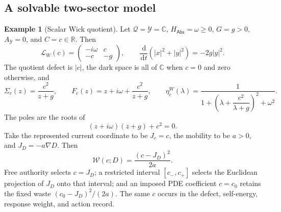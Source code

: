 \documentclass[11pt]{article}
\numberwithin{section}{part}
\theoremstyle{plain}
\theoremstyle{definition}
\newtheorem{example}[example]{Example}
\theoremstyle{remark}
\newcommand{\dd}{\,\mathrm d}
\newcommand{\Abs}{\mathsf{Abs}}
\begin{document}
\subsection{A solvable two-sector model}
\label{subsec:wick-solvable-model}

\begin{example}[Scalar Wick quotient]
\label{ex:scalar-wick-quotient}
Let \(\mathcal Q=\mathcal Y=\mathbb C\),
\(H_{\Abs}=\omega\ge0\), \(G=g>0\),
\(A_{\mathcal Y}=0\), and \(C=c\in\mathbb R\).  Then
\begin{equation}
 \label{eq:scalar-wick-generator}
 \mathcal L_W(c)=
 \begin{pmatrix}-i\omega&c\\-c&-g\end{pmatrix},
 \qquad
 \frac{\dd}{\dd t}(|x|^2+|y|^2)=-2g|y|^2.
\end{equation}
The quotient defect is \(|c|\), the dark space is all of \(\mathbb C\) when
\(c=0\) and zero otherwise, and
\begin{equation}
 \label{eq:scalar-wick-response}
 \Sigma_c(z)=\frac{c^2}{z+g},
 \qquad
 F_c(z)=z+i\omega+\frac{c^2}{z+g},
 \qquad
 \eta_c^W(\lambda)
 =\frac{1}{1+\left(\lambda+\dfrac{c^2}{\lambda+g}\right)^2+\omega^2}.
\end{equation}
The poles are the roots of
\begin{equation}
 \label{eq:scalar-wick-poles}
 (z+i\omega)(z+g)+c^2=0.
\end{equation}
Take the represented current coordinate to be \(J_c=c\), the mobility to be
\(a>0\), and \(J_D=-a\nabla D\).  Then
\[
 \mathscr W(c;D)=\frac{(c-J_D)^2}{2a}.
\]
Free authority selects \(c=J_D\); a restricted interval
\([c_-,c_+]\) selects the Euclidean projection of \(J_D\) onto that
interval; and an imposed PDE coefficient \(c=c_0\) retains the fixed waste
\((c_0-J_D)^2/(2a)\).  The same \(c\) occurs in the defect, self-energy,
response weight, and action record.
\end{example}
\end{document}
